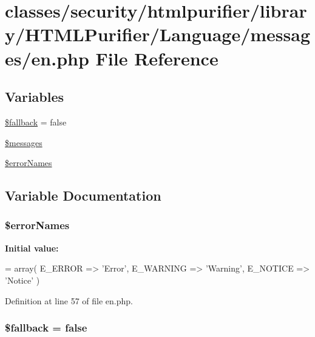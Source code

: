 \hypertarget{en_8php}{\section{classes/security/htmlpurifier/library/\+H\+T\+M\+L\+Purifier/\+Language/messages/en.php File Reference}
\label{en_8php}
}
\subsection*{Variables}
\begin{DoxyCompactItemize}
\item 
\hyperlink{en_8php_a0aa2d1acd291d3fedc1a3617d716e28e}{\$fallback} = false
\item 
\hyperlink{en_8php_a21a183f927a6d243fe6b4ba3a6c4d4c8}{\$messages}
\item 
\hyperlink{en_8php_aadc04af641adc835e19a08fbc6473b34}{\$error\+Names}
\end{DoxyCompactItemize}


\subsection{Variable Documentation}
\hypertarget{en_8php_aadc04af641adc835e19a08fbc6473b34}{
\subsubsection[{\$error\+Names}]{\setlength{\rightskip}{0pt plus 5cm}\$error\+Names}}\label{en_8php_aadc04af641adc835e19a08fbc6473b34}
{\bfseries Initial value\+:}
\begin{DoxyCode}
= array(
    E\_ERROR   => \textcolor{stringliteral}{'Error'},
    E\_WARNING => \textcolor{stringliteral}{'Warning'},
    E\_NOTICE  => \textcolor{stringliteral}{'Notice'}
)
\end{DoxyCode}


Definition at line 57 of file en.\+php.

\hypertarget{en_8php_a0aa2d1acd291d3fedc1a3617d716e28e}{
\subsubsection[{\$fallback}]{\setlength{\rightskip}{0pt plus 5cm}\$fallback = false}}\label{en_8php_a0aa2d1acd291d3fedc1a3617d716e28e}


